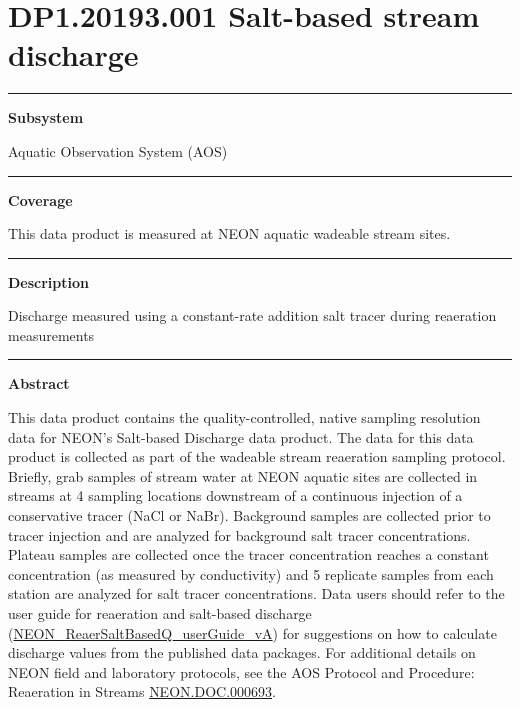 \documentclass[]{article}
\begin{document}
\section{DP1.20193.001 Salt-based stream
discharge}\label{dp1.20193.001-salt-based-stream-discharge}

\begin{center}\rule{0.5\linewidth}{\linethickness}\end{center}

\textbf{Subsystem}

Aquatic Observation System (AOS)

\begin{center}\rule{0.5\linewidth}{\linethickness}\end{center}

\textbf{Coverage}

This data product is measured at NEON aquatic wadeable stream sites.

\begin{center}\rule{0.5\linewidth}{\linethickness}\end{center}

\textbf{Description}

Discharge measured using a constant-rate addition salt tracer during
reaeration measurements

\begin{center}\rule{0.5\linewidth}{\linethickness}\end{center}

\textbf{Abstract}

This data product contains the quality-controlled, native sampling
resolution data for NEON's Salt-based Discharge data product. The data
for this data product is collected as part of the wadeable stream
reaeration sampling protocol. Briefly, grab samples of stream water at
NEON aquatic sites are collected in streams at 4 sampling locations
downstream of a continuous injection of a conservative tracer (NaCl or
NaBr). Background samples are collected prior to tracer injection and
are analyzed for background salt tracer concentrations. Plateau samples
are collected once the tracer concentration reaches a constant
concentration (as measured by conductivity) and 5 replicate samples from
each station are analyzed for salt tracer concentrations. Data users
should refer to the user guide for reaeration and salt-based discharge
(\href{http://data.neonscience.org/api/v0/documents/NEON_ReaerSaltBasedQ_userGuide_vA}{NEON\_ReaerSaltBasedQ\_userGuide\_vA})
for suggestions on how to calculate discharge values from the published
data packages. For additional details on NEON field and laboratory
protocols, see the AOS Protocol and Procedure: Reaeration in Streams
\href{http://data.neonscience.org/api/v0/documents/NEON.DOC.000693vH}{NEON.DOC.000693}.
\end{document}
